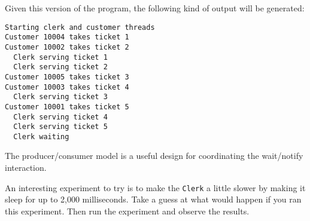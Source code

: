 \noindent Given this version of the program, the following kind of
output will be generated:


\begin{jjjlisting}
\begin{lstlisting}
Starting clerk and customer threads
Customer 10004 takes ticket 1
Customer 10002 takes ticket 2
  Clerk serving ticket 1
  Clerk serving ticket 2
Customer 10005 takes ticket 3
Customer 10003 takes ticket 4
  Clerk serving ticket 3
Customer 10001 takes ticket 5
  Clerk serving ticket 4
  Clerk serving ticket 5
  Clerk waiting
\end{lstlisting}
\end{jjjlisting}




{The producer/consumer model is a useful design for coordinating the wait/notify interaction.}

\label{self-study-exercise}
\begin{SSTUDY}

\item  An interesting experiment to try is to make the {\tt Clerk} a little
slower by making it sleep for up to 2,000 milliseconds.  Take a
guess at what would happen if you ran this experiment.  Then
run the experiment and observe the results.
\end{SSTUDY}

